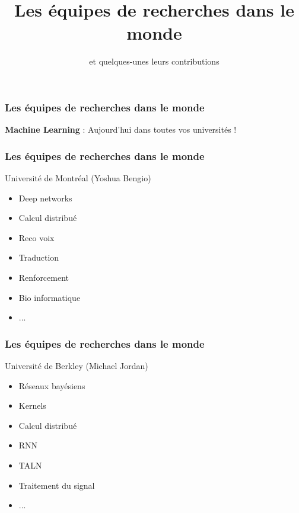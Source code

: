 \documentclass{formation}
\title{Les équipes de recherches dans le monde}
\subtitle{et quelques-unes leurs contributions}
\begin{document}
\maketitle

\begin{frame}
  \frametitle{Les équipes de recherches dans le monde}
  \begin{center}
    \huge
  \textbf{Machine Learning} :
  \newline
  \newline
  Aujourd'hui dans toutes vos universités !
  \end{center}
\end{frame}

\begin{frame}
  \frametitle{Les équipes de recherches dans le monde}
  Université de Montréal (Yoshua Bengio)
  \begin{minipage}[c]{0.50\linewidth}
  \begin{itemize}
  \item Deep networks
  \item Calcul distribué
  \item Reco voix
  \item Traduction
  \item Renforcement
  \item Bio informatique
  \item ...
  \end{itemize}
  \end{minipage}\hfill
  \begin{minipage}[c]{0.49\linewidth}
  \end{minipage}\hfill
\end{frame}

\begin{frame}
  \frametitle{Les équipes de recherches dans le monde}
  Université de Berkley (Michael Jordan)
  \begin{minipage}[c]{0.50\linewidth}
  \begin{itemize}
  \item Réseaux bayésiens
  \item Kernels
  \item Calcul distribué
  \item RNN
  \item TALN
  \item Traitement du signal
  \item ...
  \end{itemize}
  \end{minipage}\hfill
  \begin{minipage}[c]{0.49\linewidth}
  \end{minipage}\hfill
\end{frame}
\end{document}
